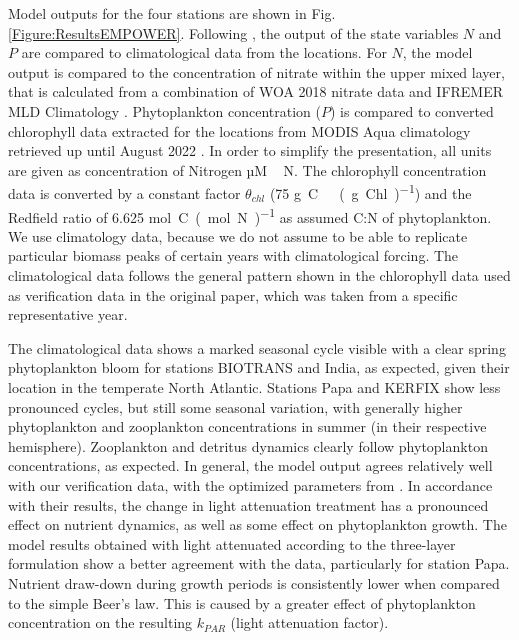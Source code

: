 \documentclass[gmd, manuscript]{copernicus}
\begin{document}
Model outputs for the four stations are shown in Fig. \ref{Figure:ResultsEMPOWER}. Following \citet{Anderson2015c}, the output of the state variables $N$ and $P$ are compared to climatological data from the locations. For $N$, the model output is compared to the concentration of nitrate within the upper mixed layer, that is calculated from a combination of WOA 2018 nitrate data \citep{Garcia2019WORLDSilicate} and IFREMER MLD Climatology \citep{DeBoyerMontegut2004}. Phytoplankton concentration ($P$) is compared to converted chlorophyll data extracted for the locations from MODIS Aqua climatology retrieved up until August 2022 \citep{NASAGoddardSpaceFlightCenterOceanEcologyLaboratoryOceanBiologyProcessingGroup}. In order to simplify the presentation, all units are given as concentration of Nitrogen \unit{µM\,N}. The chlorophyll concentration data is converted by a constant factor $\theta_{chl}$ (75 \unit{g C \ (g Chl)^{−1}}) and the Redfield ratio of 6.625 \unit{mol C (mol N)^{-1}} as assumed C:N of phytoplankton. We use climatology data, because we do not assume to be able to replicate particular biomass peaks of certain years with climatological forcing. The climatological data follows the general pattern shown in the chlorophyll data used as verification data in the original paper, which was taken from a specific representative year.

The climatological data shows a marked seasonal cycle visible with a clear spring phytoplankton bloom for stations BIOTRANS and India, as expected, given their location in the temperate North Atlantic. Stations Papa and KERFIX show less pronounced cycles, but still some seasonal variation, with generally higher phytoplankton and zooplankton concentrations in summer (in their respective hemisphere). Zooplankton and detritus dynamics clearly follow phytoplankton concentrations, as expected.
In general, the model output agrees relatively well with our verification data, with the optimized parameters from \citet{Anderson2015c}. In accordance with their results, the change in light attenuation treatment has a pronounced effect on nutrient dynamics, as well as some effect on phytoplankton growth. The model results obtained with light attenuated according to the three-layer formulation show a better agreement with the data, particularly for station Papa. Nutrient draw-down during growth periods is consistently lower when compared to the simple Beer's law. This is caused by a greater effect of phytoplankton concentration on the resulting $k_{PAR}$ (light attenuation factor).
\end{document}
